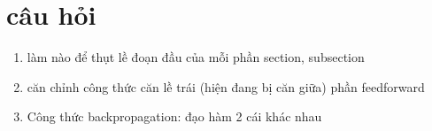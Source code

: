 \documentclass[12pt,a4paper]{report}
\begin{document}





\section{câu hỏi}
\begin{enumerate}
\item làm nào để thụt lề đoạn đầu của mỗi phần section, subsection
\item căn chỉnh công thức căn lề trái (hiện đang bị căn giữa) phần feedforward
\item Công thức backpropagation: đạo hàm 2 cái khác nhau
\end{enumerate}
\end{document}
